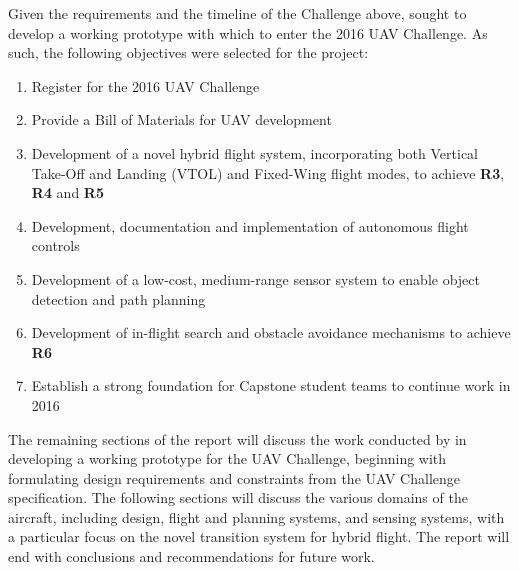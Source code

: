 Given the requirements and the timeline of the Challenge above, \ID sought to develop a working prototype with which to enter the 2016 UAV Challenge. As such, the following objectives were selected for the project:
\begin{enumerate}[label=\bfseries O\arabic*:] \itemsep-2pt
	\item Register for the 2016 UAV Challenge
	\item Provide a Bill of Materials for UAV development
	\item Development of a novel hybrid flight system, incorporating both Vertical Take-Off and Landing (VTOL) and Fixed-Wing flight modes, to achieve \textbf{R3}, \textbf{R4} and \textbf{R5}
	\item Development, documentation and implementation of autonomous flight controls
	\item Development of a low-cost, medium-range sensor system to enable object detection and path planning
	\item Development of in-flight search and obstacle avoidance mechanisms to achieve \textbf{R6}
	\item Establish a strong foundation for Capstone student teams to continue work in 2016
\end{enumerate}

The remaining sections of the report will discuss the work conducted by \ID in developing a working prototype for the UAV Challenge, beginning with formulating design requirements and constraints from the UAV Challenge specification. The following sections will discuss the various domains of the aircraft, including design, flight and planning systems, and sensing systems, with a particular focus on the novel transition system for hybrid flight. The report will end with conclusions and recommendations for future work.